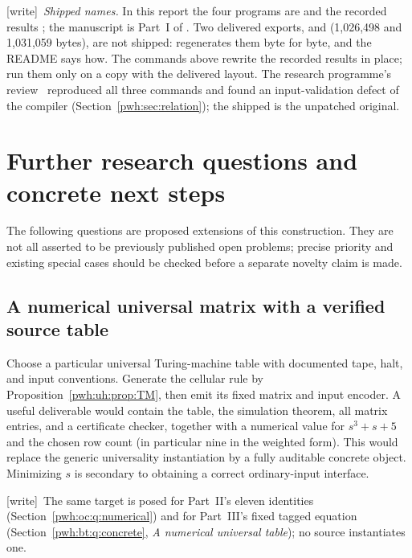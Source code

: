 \documentclass[11pt,letterpaper]{article}
\numberwithin{equation}{section}
\theoremstyle{definition}
\newcommand{\wtag}{\textup{[write]}}
\begin{document}
\wtag\ \emph{Shipped names.} In this report the four programs are
 and the recorded results
; the manuscript is Part~I of
. Two delivered exports,
 and
 (1,026,498 and 1,031,059
bytes), are not shipped:  regenerates them
byte for byte, and the README says how. The commands above rewrite the
recorded results in place; run them only on a copy with the delivered
layout. The research programme's review~\cite{reviewUH} reproduced all
three commands and found an input-validation defect of the compiler
(Section~\ref{pwh:sec:relation}); the shipped
 is the
unpatched original.

\section{Further research questions and concrete next steps}
\label{pwh:uh:sec:research}

The following questions are proposed extensions of this construction.
They are not all asserted to be previously published open problems;
precise priority and existing special cases should be checked before a
separate novelty claim is made.

\subsection{A numerical universal matrix with a verified source table}\label{pwh:uh:q:numerical}

Choose a particular universal Turing-machine table with documented tape,
halt, and input conventions. Generate the cellular rule by
Proposition~\ref{pwh:uh:prop:TM}, then emit its fixed matrix and input encoder.
A useful deliverable would contain the table, the simulation theorem,
all matrix entries, and a certificate checker, together with a numerical
value for $s^3+s+5$ and the chosen row count (in particular nine
in the weighted form). This would replace the generic universality
instantiation by a fully auditable concrete object. Minimizing $s$ is
secondary to obtaining a correct ordinary-input interface.

\wtag\ The same target is posed for Part~II's eleven identities
(Section~\ref{pwh:oc:q:numerical}) and for Part~III's fixed tagged equation
(Section~\ref{pwh:bt:q:concrete}, \emph{A numerical universal table}); no
source instantiates one.
\end{document}
